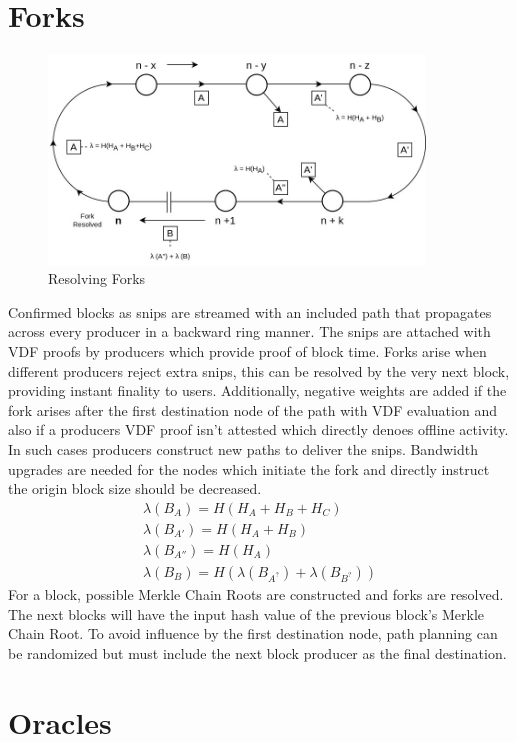 \documentclass[a4paper,10pt]{article}
\begin{document}
\section{Forks}
\begin{figure}[H]
\begin{center}
\includegraphics[width=10cm]{fork}
\caption{Resolving Forks}
\end{center}
\end{figure}
Confirmed blocks as snips are streamed with an included path that propagates across every producer in a backward ring manner. The snips are attached with VDF proofs by producers which provide proof of block time. Forks arise when different producers reject extra snips, this can be resolved by the very next block, providing instant finality to users. Additionally, negative weights are added if the fork arises after the first destination node of the path with VDF evaluation and also if a producers VDF proof isn't attested which directly denoes offline activity. In such cases producers construct new paths to deliver the snips. Bandwidth upgrades are needed for the nodes which initiate the fork and directly instruct the origin block size should be decreased.
\begin{align*}
\lambda (B_A) = H(H_A+H_B+H_C) \\
\lambda (B_{A'}) = H(H_A+H_B)\\
\lambda (B_{A''}) = H(H_A)  \\
\lambda (B_{B}) = H(\lambda(B_{A^?}) + \lambda(B_{B^?}))
\end{align*}
For a block, possible Merkle Chain Roots are constructed and forks are resolved. The next blocks will have the input hash value of the previous block's Merkle Chain Root. To avoid influence by the first destination node, path planning can be randomized but must include the next block producer as the final destination.
\section{Oracles}
\end{document}
